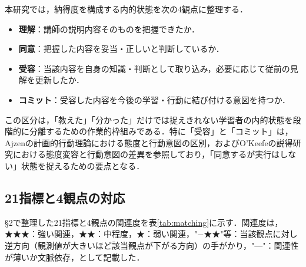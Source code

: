 \documentclass[Japanese]{dicomopapers}
\begin{document}
本研究では，納得度を構成する内的状態を次の4観点に整理する．

\begin{itemize}
\setlength{\itemsep}{0pt}
\item \textbf{理解}：講師の説明内容そのものを把握できたか．
\item \textbf{同意}：把握した内容を妥当・正しいと判断しているか．
\item \textbf{受容}：当該内容を自身の知識・判断として取り込み，必要に応じて従前の見解を更新したか．
\item \textbf{コミット}：受容した内容を今後の学習・行動に結び付ける意図を持つか．
\end{itemize}

この区分は，「教えた」「分かった」だけでは捉えきれない学習者の内的状態を段階的に分離するための作業的枠組みである．特に「受容」と「コミット」は，Ajzen\cite{Ajzen1991}の計画的行動理論における態度と行動意図の区別，およびO'Keefe\cite{OKeefe2002}の説得研究における態度変容と行動意図の差異を参照しており，「同意するが実行はしない」状態を捉えるための要点となる．

\subsection{21指標と4観点の対応}

\S2で整理した21指標と4観点の関連度を表\ref{tab:matching}に示す．関連度は，★★★：強い関連，★★：中程度，★：弱い関連，"$-$★★"等：当該観点に対し逆方向（観測値が大きいほど該当観点が下がる方向）の手がかり，"---"：関連性が薄いか文脈依存，として記載した．
\end{document}
